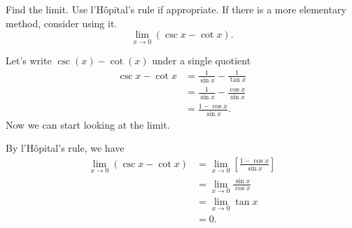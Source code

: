 \documentclass[article,oneside]{memoir}
\begin{document}
\begin{problem*}
  Find the limit. Use l'Hôpital's rule if appropriate. If there is a more
  elementary method, consider using it.
  \[
    \lim_{x\to 0}(\csc x-\cot x).
  \]
\end{problem*}
\begin{solution}
  Let's write \(\csc(x)-\cot(x)\) under a single quotient
  \begin{align*}
    \csc x-\cot x
    &=\frac{1}{\sin x}-\frac{1}{\tan x}\\
    &=\frac{1}{\sin x}-\frac{\cos x}{\sin x}\\
    &=\frac{1-\cos x}{\sin x}.
  \end{align*}
  Now we can start looking at the limit.

  By l'Hôpital's rule, we have
  \begin{align*}
    \lim_{x\to 0}(\csc x-\cot x)
    &=\lim_{x\to 0}\left[\frac{1-\cos x}{\sin x}\right]\\
    &=\lim_{x\to 0}\frac{\sin x}{\cos x}\\
    &=\lim_{x\to 0}\tan x\\
    &=0.
  \end{align*}
\end{solution}
\end{document}
